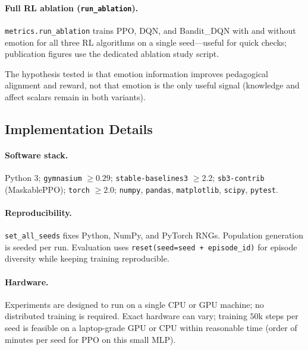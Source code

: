 \paragraph{Full RL ablation (\texttt{run\_ablation}).}
\texttt{metrics.run\_ablation} trains PPO, DQN, and Bandit\_DQN with and without emotion for all three RL algorithms on a single seed---useful for quick checks; publication figures use the dedicated ablation study script.

The hypothesis tested is that emotion information improves pedagogical alignment and reward, not that emotion is the only useful signal (knowledge and affect scalars remain in both variants).

\subsection{Implementation Details}\label{sec:method_rl_implementation}

\paragraph{Software stack.}
Python 3; \texttt{gymnasium} $\geq 0.29$; \texttt{stable-baselines3} $\geq 2.2$; \texttt{sb3-contrib} (MaskablePPO); \texttt{torch} $\geq 2.0$; \texttt{numpy}, \texttt{pandas}, \texttt{matplotlib}, \texttt{scipy}, \texttt{pytest}.

\paragraph{Reproducibility.}
\texttt{set\_all\_seeds} fixes Python, NumPy, and PyTorch RNGs. Population generation is seeded per run. Evaluation uses \texttt{reset(seed=seed + episode\_id)} for episode diversity while keeping training reproducible.

\paragraph{Hardware.}
Experiments are designed to run on a single CPU or GPU machine; no distributed training is required. Exact hardware can vary; training $50$k steps per seed is feasible on a laptop-grade GPU or CPU within reasonable time (order of minutes per seed for PPO on this small MLP).

